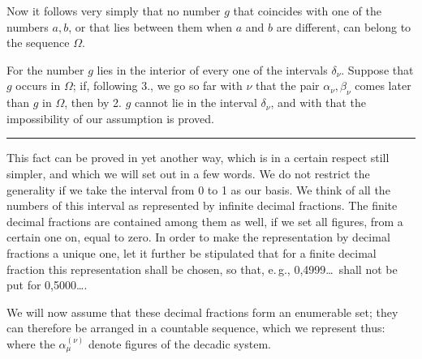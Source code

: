 
Now it follows very simply that no number $g$ that coincides with one of the numbers $a, b$, or that lies between them when $a$ and $b$ are different, can belong to the sequence $\Omega$.

For the number $g$ lies in the interior of every one of the intervals $\delta_\nu$. Suppose that $g$ occurs in $\Omega$; if, following 3., we go so far with $\nu$ that the pair $\alpha_\nu, \beta_\nu$ comes later than $g$ in $\Omega$, then by 2. $g$ cannot lie in the interval $\delta_\nu$, and with that the impossibility of our assumption is proved.


\begin{center}
\rule{4cm}{0.4pt}
\end{center}

This fact can be proved in yet another way, which is in a certain respect still simpler, and which we will set out in a few words. We do not restrict the generality if we take the interval from 0 to 1 as our basis. We think of all the numbers of this interval as represented by infinite decimal fractions. The finite decimal fractions are contained among them as well, if we set all figures, from a certain one on, equal to zero. In order to make the representation by decimal fractions a unique one, let it further be stipulated that for a finite decimal fraction this representation shall  be chosen, so that, e.\,g., 0,4999\dots\ shall not be put for 0,5000\dots.

We will now assume that these decimal fractions form an enumerable set; they can therefore be arranged in a countable sequence, which we represent thus:
where the $\alpha_\mu^{(\nu)}$ denote figures of the decadic system.

